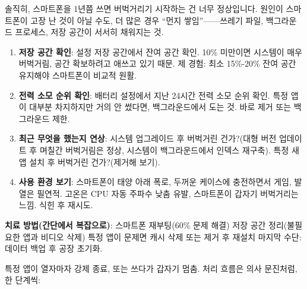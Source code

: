 


솔직히, 스마트폰을 1년쯤 쓰면 버벅거리기 시작하는 건 너무 정상입니다. 원인이 스마트폰이 고장 난 것이 아닐 수도, 더 많은 경우 “먼지 쌓임”——쓰레기 파일, 백그라운드 프로세스, 저장 공간이 서서히 채워지는 것.


\begin{enumerate}
  \item \textbf{저장 공간 확인}: 설정 저장 공간에서 잔여 공간 확인. 10\% 미만이면 시스템이 매우 버벅거림, 공간 확보하려고 애쓰고 있기 때문. 제 경험: 최소 15\%-20\% 잔여 공간 유지해야 스마트폰이 비교적 원활.
  \item \textbf{전력 소모 순위 확인}: 배터리 설정에서 지난 24시간 전력 소모 순위 확인. 특정 앱이 대부분 차지하지만 거의 안 썼다면, 백그라운드에서 도는 것. 바로 제거 또는 백그라운드 제한.
  \item \textbf{최근 무엇을 했는지 연상}: 시스템 업그레이드 후 버벅거린 건가?(대형 버전 업데이트 후 며칠간 버벅거림은 정상, 시스템이 백그라운드에서 인덱스 재구축). 특정 새 앱 설치 후 버벅거린 건가?(제거해 보기).
  \item \textbf{사용 환경 보기}: 스마트폰이 태양 아래 폭로, 두꺼운 케이스에 충전하면서 게임, 발열은 필연적. 고온은 CPU 자동 주파수 낮춤 유발, 스마트폰이 갑자기 버벅거리는 느낌. 식힌 후 재시도.
\end{enumerate}

\textbf{치료 방법(간단에서 복잡으로)}: 스마트폰 재부팅(60\% 문제 해결) 저장 공간 정리(불필요한 앱과 비디오 삭제) 특정 앱이 문제면 캐시 삭제 또는 제거 후 재설치 마지막 수단: 데이터 백업 후 공장 초기화.


특정 앱이 열자마자 강제 종료, 또는 쓰다가 갑자기 멈춤. 처리 흐름은 의사 문진처럼, 한 단계씩:

